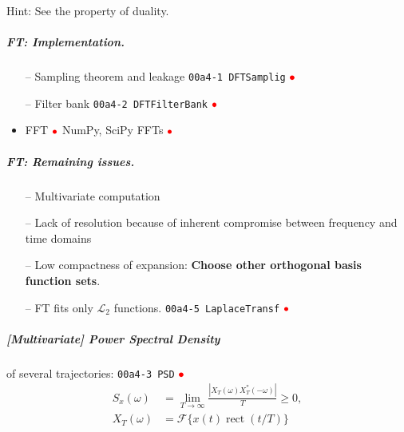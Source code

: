 \documentclass[17pt,a4paper]{extarticle}
\newcommand{\gc}[1]{\textcolor[rgb]{1.00,0.00,0.00}{#1}}
\newcommand{\alp}[1]{\textcolor[rgb]{0.00,0.00,1.00}{\small\texttt{#1}}}
\begin{document}
Hint: See the property of duality. 
\subparagraph{\textit{FT}: Implementation.}
\begin{itemize}
	\item[--] Sampling theorem and leakage \alp{00a4-1 DFTSamplig} \href{https://deepnote.com/workspace/gcpds-76307f69-c109-4b50-8818-29b8600ffe98/project/Fundamentals-ef1064c8-5ffe-4039-a3f4-6f71bb3de118/notebook/00a4-1%20DFTSamplig-18ba00e2cf9b4daa936617b092bfe695}{$\gc{\bullet}$}
	\item[--] Filter bank \alp{00a4-2 DFTFilterBank}
	\href{https://deepnote.com/workspace/gcpds-76307f69-c109-4b50-8818-29b8600ffe98/project/Fundamentals-ef1064c8-5ffe-4039-a3f4-6f71bb3de118/notebook/00a4-2%20DFTFilterBank-46284293d4b84b5a9aa936239336352c}{$\gc{\bullet}$}
	\item FFT
	\href{https://mecha-mind.medium.com/an-excursion-into-fast-fourier-transform-part-2-81461f125880}{$\gc{\bullet}$} NumPy, SciPy FFTs
	\href{https://medium.com/@Doug-Creates/numpy-scipy-ffts-distinct-performance-real-valued-optimizations-917a9f649aa5}{$\gc{\bullet}$}
\end{itemize}
\clearpage
\subparagraph{\textit{FT}: Remaining issues.}
\begin{itemize}
	\item[--] Multivariate computation 
	
	\item[--] Lack of resolution because of inherent compromise between frequency and time domains	
	
	\item[--] Low compactness of expansion: \textbf{Choose other orthogonal basis function sets}.
	
	\item[--] FT fits only $\mathcal{L}_{2}$ functions. \alp{00a4-5 LaplaceTransf}
	\href{https://deepnote.com/workspace/gcpds-76307f69-c109-4b50-8818-29b8600ffe98/project/Fundamentals-ef1064c8-5ffe-4039-a3f4-6f71bb3de118/notebook/00a4-5%20LaplaceTransf-81b1ecd3e1504bd49e70f895afd75b17}{$\gc{\bullet}$}
\end{itemize}
\begin{figure}[!h] 
	\centering
	{} 
\end{figure}
\clearpage

\begin{wrapfigure}{r}{.51\textwidth}
	\centering
	{} 
	{}
\end{wrapfigure}
\subparagraph{[Multivariate] Power Spectral Density} of several trajectories: \alp{00a4-3 PSD}
\href{https://deepnote.com/workspace/gcpds-76307f69-c109-4b50-8818-29b8600ffe98/project/Fundamentals-ef1064c8-5ffe-4039-a3f4-6f71bb3de118/notebook/00a4-3%20PSD-10765ee3e8f246139959dc962eb47afe}{$\gc{\bullet}$}
\begin{align*}
	S_{x}(\omega)&=\lim_{T\rightarrow\infty}\frac{|X_{T}(\omega)X_{T}^{*}(-\omega)|}{T}\geq 0,\\ X_{T}(\omega)&=\mathscr{F}\{x(t)\operatorname{rect}(t/T)\}
\end{align*}
 
\end{document}
